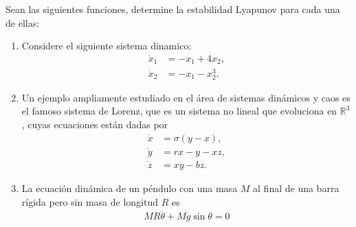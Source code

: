 \documentclass[
  11pt,
  letterpaper,
   addpoints,
   answers
  ]{exam}
\begin{document}
\begin{questions}
\begin{solution}
\end{solution}
\question Sean las siguientes funciones, determine la estabilidad Lyapunov para cada una de ellas:
\begin{enumerate}
    \item Considere el siguiente sistema dinamico: 
    \begin{align}
        \dot{x}_1 &= -x_1 + 4x_2, \\
        \dot{x}_2 &= -x_1 - x_2^3.
    \end{align}
    \item Un ejemplo ampliamente estudiado en el área de sistemas dinámicos y caos es el famoso sistema de Lorenz, que es un sistema no lineal que evoluciona en \( \mathbb{R}^3 \), cuyas ecuaciones están dadas por
    \begin{align}
        \dot{x} &= \sigma (y - x), \\
        \dot{y} &= r x - y - x z, \\
        \dot{z} &= x y - b z.
    \end{align}
    
    \item La ecuación dinámica de un péndulo con una masa \( M \) al final de una barra rígida pero sin masa de longitud \( R \) es
    \begin{align}
        MR\ddot{\theta} + Mg \sin \theta = 0
    \end{align}

\end{enumerate}
\begin{solution}

\end{solution}
\end{questions}
\end{document}
